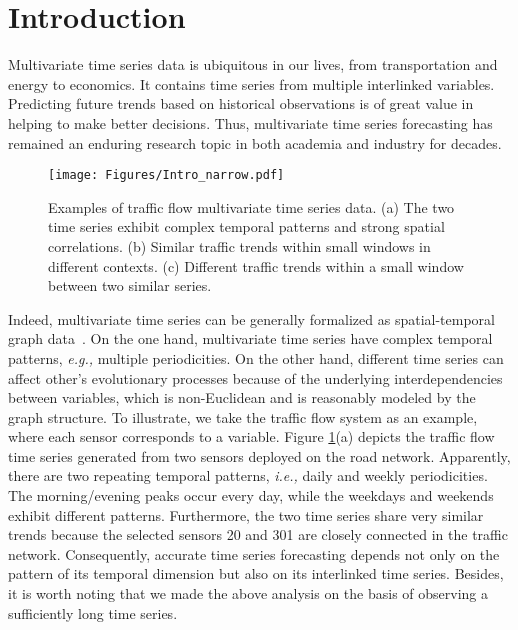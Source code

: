 \documentclass[sigconf]{acmart}
\newcommand{\eg}{\textit{e.g.,}\xspace}
\newcommand{\ie}{\textit{i.e.,}\xspace}
\begin{document}


\maketitle
\section{Introduction}
\label{sec_intro}

Multivariate time series data is ubiquitous in our lives, from transportation and energy to economics.
It contains time series from multiple interlinked variables.
Predicting future trends based on historical observations is of great value in helping to make better decisions.
Thus, multivariate time series forecasting has remained an enduring research topic in both academia and industry for decades.

\begin{figure}[t]
  \centering
  \setlength{\abovecaptionskip}{0.2cm}
  \setlength{\belowcaptionskip}{-0.4cm}
  \texttt{[image: Figures/Intro\_narrow.pdf]}
  \caption{
{
\fontsize{8.7pt}{\baselineskip}\selectfont 
  Examples of traffic flow multivariate time series data.
  (a) The two time series exhibit complex temporal patterns and strong spatial correlations.
  (b) Similar traffic trends within small windows in different contexts.
  (c) Different traffic trends within a small window between two similar series.
  }}
  \label{Intro}
\end{figure}

Indeed, multivariate time series can be generally formalized as spatial-temporal graph data~\cite{GWNet}.
On the one hand, multivariate time series have complex temporal patterns, \eg multiple periodicities.
On the other hand, different time series can affect other's evolutionary processes because of the underlying interdependencies between variables, which is non-Euclidean and is reasonably modeled by the graph structure.
To illustrate, we take the traffic flow system as an example, where each sensor corresponds to a variable.
Figure \ref{Intro}(a) depicts the traffic flow time series generated from two sensors deployed on the road network.
Apparently, there are two repeating temporal patterns, \ie daily and weekly periodicities.
The morning/evening peaks occur every day, while the weekdays and weekends exhibit different patterns.
Furthermore, the two time series share very similar trends because the selected sensors 20 and 301 are closely connected in the traffic network.
Consequently, accurate time series forecasting depends not only on the pattern of its temporal dimension but also on its interlinked time series.
Besides, it is worth noting that we made the above analysis on the basis of observing a sufficiently long time series.
\end{document}
